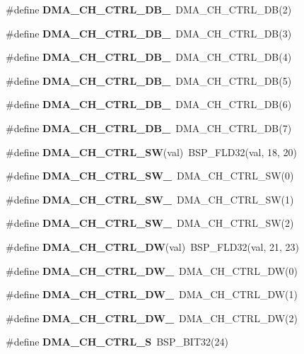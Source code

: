 \begin{Indent}
\begin{DoxyCompactItemize}
\item 
\#define {\bfseries D\+M\+A\+\_\+\+C\+H\+\_\+\+C\+T\+R\+L\+\_\+\+D\+B\+\_}~D\+M\+A\+\_\+\+C\+H\+\_\+\+C\+T\+R\+L\+\_\+\+DB(2)
\item 
\#define {\bfseries D\+M\+A\+\_\+\+C\+H\+\_\+\+C\+T\+R\+L\+\_\+\+D\+B\+\_}~D\+M\+A\+\_\+\+C\+H\+\_\+\+C\+T\+R\+L\+\_\+\+DB(3)
\item 
\#define {\bfseries D\+M\+A\+\_\+\+C\+H\+\_\+\+C\+T\+R\+L\+\_\+\+D\+B\+\_}~D\+M\+A\+\_\+\+C\+H\+\_\+\+C\+T\+R\+L\+\_\+\+DB(4)
\item 
\#define {\bfseries D\+M\+A\+\_\+\+C\+H\+\_\+\+C\+T\+R\+L\+\_\+\+D\+B\+\_}~D\+M\+A\+\_\+\+C\+H\+\_\+\+C\+T\+R\+L\+\_\+\+DB(5)
\item 
\#define {\bfseries D\+M\+A\+\_\+\+C\+H\+\_\+\+C\+T\+R\+L\+\_\+\+D\+B\+\_}~D\+M\+A\+\_\+\+C\+H\+\_\+\+C\+T\+R\+L\+\_\+\+DB(6)
\item 
\#define {\bfseries D\+M\+A\+\_\+\+C\+H\+\_\+\+C\+T\+R\+L\+\_\+\+D\+B\+\_}~D\+M\+A\+\_\+\+C\+H\+\_\+\+C\+T\+R\+L\+\_\+\+DB(7)
\item 
\#define {\bfseries D\+M\+A\+\_\+\+C\+H\+\_\+\+C\+T\+R\+L\+\_\+\+SW}(val)~B\+S\+P\+\_\+\+F\+L\+D32(val, 18, 20)
\item 
\#define {\bfseries D\+M\+A\+\_\+\+C\+H\+\_\+\+C\+T\+R\+L\+\_\+\+S\+W\+\_}~D\+M\+A\+\_\+\+C\+H\+\_\+\+C\+T\+R\+L\+\_\+\+SW(0)
\item 
\#define {\bfseries D\+M\+A\+\_\+\+C\+H\+\_\+\+C\+T\+R\+L\+\_\+\+S\+W\+\_}~D\+M\+A\+\_\+\+C\+H\+\_\+\+C\+T\+R\+L\+\_\+\+SW(1)
\item 
\#define {\bfseries D\+M\+A\+\_\+\+C\+H\+\_\+\+C\+T\+R\+L\+\_\+\+S\+W\+\_}~D\+M\+A\+\_\+\+C\+H\+\_\+\+C\+T\+R\+L\+\_\+\+SW(2)
\item 
\#define {\bfseries D\+M\+A\+\_\+\+C\+H\+\_\+\+C\+T\+R\+L\+\_\+\+DW}(val)~B\+S\+P\+\_\+\+F\+L\+D32(val, 21, 23)
\item 
\#define {\bfseries D\+M\+A\+\_\+\+C\+H\+\_\+\+C\+T\+R\+L\+\_\+\+D\+W\+\_}~D\+M\+A\+\_\+\+C\+H\+\_\+\+C\+T\+R\+L\+\_\+\+DW(0)
\item 
\#define {\bfseries D\+M\+A\+\_\+\+C\+H\+\_\+\+C\+T\+R\+L\+\_\+\+D\+W\+\_}~D\+M\+A\+\_\+\+C\+H\+\_\+\+C\+T\+R\+L\+\_\+\+DW(1)
\item 
\#define {\bfseries D\+M\+A\+\_\+\+C\+H\+\_\+\+C\+T\+R\+L\+\_\+\+D\+W\+\_}~D\+M\+A\+\_\+\+C\+H\+\_\+\+C\+T\+R\+L\+\_\+\+DW(2)
\item 
\#define {\bfseries D\+M\+A\+\_\+\+C\+H\+\_\+\+C\+T\+R\+L\+\_\+S}~B\+S\+P\+\_\+\+B\+I\+T32(24)
\item 

\end{DoxyCompactItemize}
\end{Indent}
